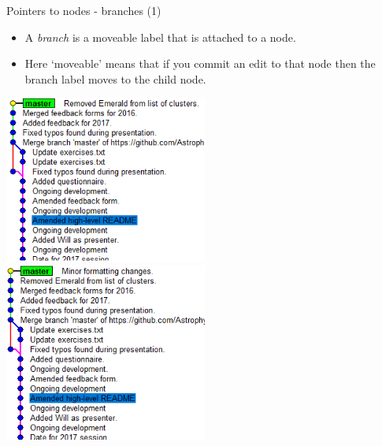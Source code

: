 \documentclass[usenames,dvipsnames]{beamer}
\begin{document}
\begin{frame}{Pointers to nodes - branches (1)}
  \begin{block}{}
    \begin{itemize}
      \item{A \textit{branch} is a moveable label that is attached to a node.}
      \item{Here `moveable' means that if you commit an edit to that node then the branch label moves to the child node.}
    \end{itemize}
  \end{block}
  \begin{block}{}
      \includegraphics[width=0.5\textwidth]{Branch_1.png}%
      \includegraphics[width=0.5\textwidth]{Branch_2.png}
  \end{block}
\end{frame}
  
\end{document}
